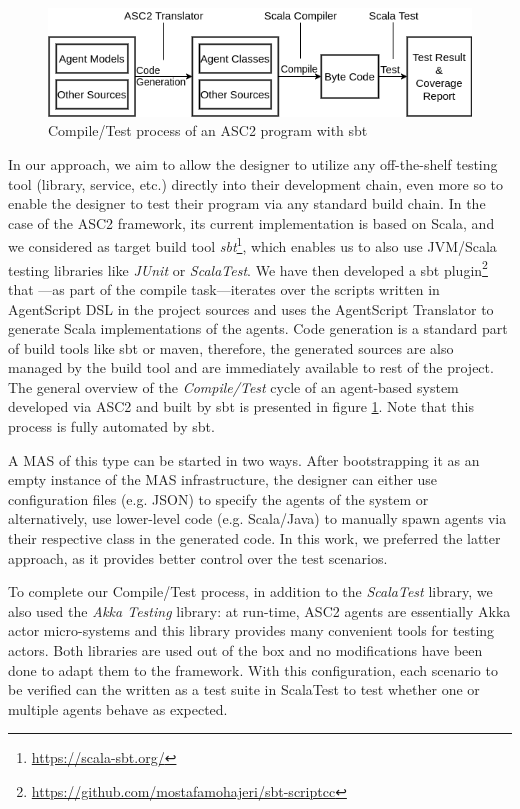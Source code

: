 \begin{figure}[t!]
  \centering
  \hspace{-5pt}
  \includegraphics[width=0.80\linewidth]{ch5/sbt_proc.png}
  \caption{Compile/Test process of an ASC2 program with sbt}
  \label{fig:sbt1}
\end{figure}

In our approach, we aim to allow the designer to utilize any off-the-shelf testing tool (library, service, etc.) directly into their development chain, even more so to enable the designer to test their program via any standard build chain. 
In the case of the ASC2 framework, its current implementation is based on Scala, and we considered as target build tool \textit{sbt}\footnote{\url{https://scala-sbt.org/}}, which enables us to also use JVM/Scala testing libraries like \textit{JUnit} or \textit{ScalaTest}. We have then developed a sbt plugin\footnote{\url{https://github.com/mostafamohajeri/sbt-scriptcc}} that %
---as part of the compile task---iterates over the scripts written in AgentScript DSL in the project sources and uses the AgentScript Translator to generate Scala implementations of the agents. Code generation is a standard part of build tools like sbt or maven, therefore, the generated sources are also managed by the build tool and are immediately available to rest of the project. The general overview of the \textit{Compile/Test} cycle of an agent-based system developed via ASC2 and built by sbt is presented in figure \ref{fig:sbt1}. Note that this process is fully automated by sbt. 


A MAS of this type can be started in two ways. After bootstrapping it as an empty instance of the MAS infrastructure, the designer can either use configuration files (e.g. JSON) to specify the agents of the system or alternatively, use lower-level code (e.g. Scala/Java) to manually spawn agents via their respective class in the generated code. In this work, we preferred the latter approach, as it provides better control over the test scenarios.

To complete our Compile/Test process, in addition to the \textit{ScalaTest} library, we also used the \textit{Akka Testing} library: at run-time, ASC2 agents are essentially Akka actor micro-systems and this library provides many convenient tools for testing actors. Both libraries are used out of the box and no modifications have been done to adapt them to the framework. With this configuration, each scenario to be verified can the written as a test suite in ScalaTest to test whether one or multiple agents behave as expected.

